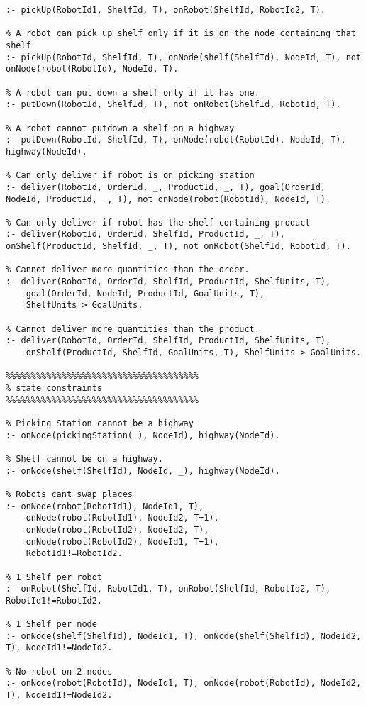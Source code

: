 \documentclass[letterpaper]{article} %
\begin{document}
\begin{lstlisting}[numbers=none,language=clingo]
% A robot cannot pickup a shelf a shelf is already on a robot
:- pickUp(RobotId1, ShelfId, T), onRobot(ShelfId, RobotId2, T).

% A robot can pick up shelf only if it is on the node containing that shelf
:- pickUp(RobotId, ShelfId, T), onNode(shelf(ShelfId), NodeId, T), not onNode(robot(RobotId), NodeId, T). 

% A robot can put down a shelf only if it has one.
:- putDown(RobotId, ShelfId, T), not onRobot(ShelfId, RobotId, T).

% A robot cannot putdown a shelf on a highway
:- putDown(RobotId, ShelfId, T), onNode(robot(RobotId), NodeId, T), highway(NodeId). 

% Can only deliver if robot is on picking station
:- deliver(RobotId, OrderId, _, ProductId, _, T), goal(OrderId, NodeId, ProductId, _, T), not onNode(robot(RobotId), NodeId, T).

% Can only deliver if robot has the shelf containing product
:- deliver(RobotId, OrderId, ShelfId, ProductId, _, T), onShelf(ProductId, ShelfId, _, T), not onRobot(ShelfId, RobotId, T).

% Cannot deliver more quantities than the order.
:- deliver(RobotId, OrderId, ShelfId, ProductId, ShelfUnits, T),
    goal(OrderId, NodeId, ProductId, GoalUnits, T),
    ShelfUnits > GoalUnits.

% Cannot deliver more quantities than the product.
:- deliver(RobotId, OrderId, ShelfId, ProductId, ShelfUnits, T),
    onShelf(ProductId, ShelfId, GoalUnits, T), ShelfUnits > GoalUnits.

%%%%%%%%%%%%%%%%%%%%%%%%%%%%%%%%%%%%%%
% state constraints
%%%%%%%%%%%%%%%%%%%%%%%%%%%%%%%%%%%%%%

% Picking Station cannot be a highway
:- onNode(pickingStation(_), NodeId), highway(NodeId).

% Shelf cannot be on a highway.
:- onNode(shelf(ShelfId), NodeId, _), highway(NodeId).

% Robots cant swap places
:- onNode(robot(RobotId1), NodeId1, T),
    onNode(robot(RobotId1), NodeId2, T+1),
    onNode(robot(RobotId2), NodeId2, T),
    onNode(robot(RobotId2), NodeId1, T+1),
    RobotId1!=RobotId2.

% 1 Shelf per robot 
:- onRobot(ShelfId, RobotId1, T), onRobot(ShelfId, RobotId2, T), RobotId1!=RobotId2.

% 1 Shelf per node
:- onNode(shelf(ShelfId), NodeId1, T), onNode(shelf(ShelfId), NodeId2, T), NodeId1!=NodeId2.

% No robot on 2 nodes
:- onNode(robot(RobotId), NodeId1, T), onNode(robot(RobotId), NodeId2, T), NodeId1!=NodeId2.


\end{lstlisting}
\end{document}
